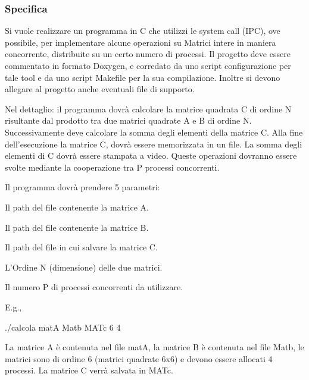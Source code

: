 \subsubsection*{Specifica}

Si vuole realizzare un programma in C che utilizzi le system call (I\+PC), ove possibile, per implementare alcune operazioni su Matrici intere in maniera concorrente, distribuite su un certo numero di processi. Il progetto deve essere commentato in formato Doxygen, e corredato da uno script configurazione per tale tool e da uno script Makefile per la sua compilazione. Inoltre si devono allegare al progetto anche eventuali file di supporto.

Nel dettaglio\+: il programma dovrà calcolare la matrice quadrata C di ordine N risultante dal prodotto tra due matrici quadrate A e B di ordine N. Successivamente deve calcolare la somma degli elementi della matrice C. Alla fine dell’esecuzione la matrice C, dovrà essere memorizzata in un file. La somma degli elementi di C dovrà essere stampata a video. Queste operazioni dovranno essere svolte mediante la cooperazione tra P processi concorrenti.

Il programma dovrà prendere 5 parametri\+:
\begin{DoxyEnumerate}
\item Il path del file contenente la matrice A.
\item Il path del file contenente la matrice B.
\item Il path del file in cui salvare la matrice C.
\item L’\+Ordine N (dimensione) delle due matrici.
\item Il numero P di processi concorrenti da utilizzare.
\end{DoxyEnumerate}

E.\+g., 
\begin{DoxyCode}
./calcola matA Matb MATc 6 4
\end{DoxyCode}


La matrice A è contenuta nel file matA, la matrice B è contenuta nel file Matb, le matrici sono di ordine 6 (matrici quadrate 6x6) e devono essere allocati 4 processi. La matrice C verrà salvata in M\+A\+Tc.

